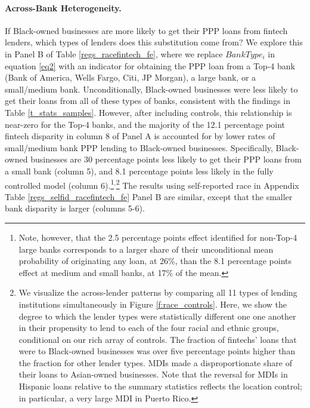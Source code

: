 \documentclass[11pt]{article}
\begin{document}
\paragraph*{Across-Bank Heterogeneity.}

If Black-owned businesses are more likely to get their PPP loans from fintech lenders, which types of lenders does this substitution come from? We explore this in Panel B of Table  \ref{regs_racefintech_fe}, where we replace $ BankType_i$ in equation \ref{eq2} with an indicator for obtaining the PPP loan from a Top-4 bank (Bank of America, Wells Fargo, Citi, JP Morgan), a large bank, or a small/medium bank. Unconditionally, Black-owned businesses were less likely to get their loans from all of these types of banks, consistent with the findings in Table \ref{t_stats_samples}. However, after including controls, this relationship is near-zero for the Top-4 banks, and the majority of the 12.1 percentage point fintech disparity in column 8 of Panel A is accounted for by lower rates of small/medium bank PPP lending to Black-owned businesses. Specifically, Black-owned businesses are 30 percentage points less likely to get their PPP loans from a small bank (column 5), and 8.1 percentage points less likely in the fully controlled model (column 6).\footnote{Note, however, that the 2.5 percentage points effect identified for non-Top-4 large banks corresponds to a larger share of their unconditional mean probability of originating any loan, at 26\%, than the 8.1 percentage points effect at medium and small banks, at 17\% of the mean.}$^{,}$\footnote{We visualize the across-lender patterns by comparing all 11 types of lending institutions simultaneously in Figure \ref{f:race_controls}. Here, we show the degree to which the lender types were statistically different one one another in their propensity to lend to each of the four racial and ethnic groups, conditional on our rich array of controls. The fraction of fintechs' loans that were to Black-owned businesses was over five percentage points higher than the fraction for other lender types. MDIs made a disproportionate share of their loans to  Asian-owned businesses. Note that the reversal for MDIs in Hispanic loans relative to the summary statistics reflects the location control; in particular, a very large MDI in Puerto Rico.} The results using self-reported race in Appendix Table \ref{regs_selfid_racefintech_fe} Panel B are similar, except that the smaller bank disparity is larger (columns 5-6).
\end{document}

